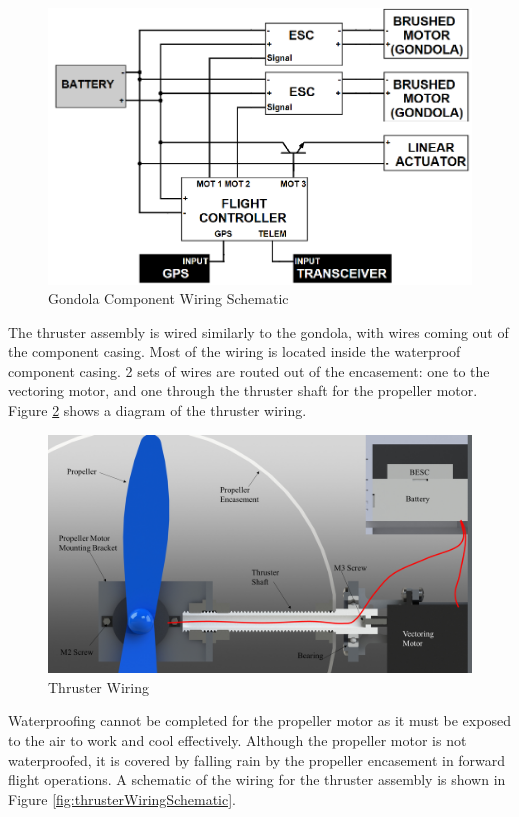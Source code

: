 \documentclass[../main.tex]{subfiles}
\begin{document}
\begin{figure}[H]
	\centering
	\includegraphics[width=.8\linewidth]{img/design/gondola/gondolaWiringSchematic.png}
	\caption{Gondola Component Wiring Schematic}
	\label{fig:gondolaWiringSchematic}
\end{figure}

The thruster assembly is wired similarly to the gondola, with wires coming out of the component casing. Most of the wiring is located inside the waterproof component casing. 2 sets of wires are routed out of the encasement: one to the vectoring motor, and one through the thruster shaft for the propeller motor. Figure \ref{fig:thrusterWiring} shows a diagram of the thruster wiring.

\begin{figure}[H]
	\centering
	\includegraphics[width=.8\linewidth]{img/design/thruster/thrusterWiring.png}
	\caption{Thruster Wiring}
	\label{fig:thrusterWiring}
\end{figure}

 Waterproofing cannot be completed for the propeller motor as it must be exposed to the air to work and cool effectively. Although the propeller motor is not waterproofed, it is covered by falling rain by the propeller encasement in forward flight operations. A schematic of the wiring for the thruster assembly is shown in Figure \ref{fig:thrusterWiringSchematic}.
\end{document}
